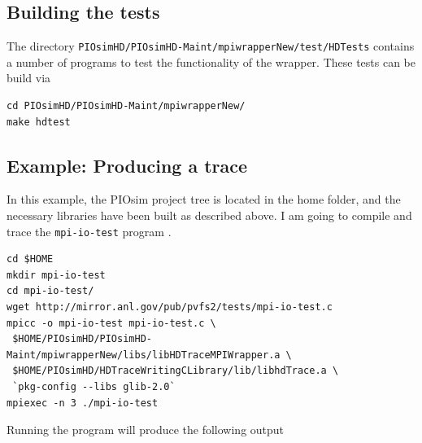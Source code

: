 \documentclass[a4paper,12pt,pdftex]{scrartcl}
\begin{document}
\subsection{Building the tests}
The directory
\lstinline|PIOsimHD/PIOsimHD-Maint/mpiwrapperNew/test/HDTests|
contains a number of programs to test the functionality of the
wrapper. These tests can be build via
\begin{lstlisting}
cd PIOsimHD/PIOsimHD-Maint/mpiwrapperNew/
make hdtest
\end{lstlisting}

\subsection{Example: Producing a trace}
In this example, the PIOsim project tree is located in the home
folder, and the necessary libraries have been built as described
above. I am going to compile and trace the \verb/mpi-io-test/ program
\cite{mpi-io-test}.
\begin{lstlisting}
cd $HOME
mkdir mpi-io-test
cd mpi-io-test/
wget http://mirror.anl.gov/pub/pvfs2/tests/mpi-io-test.c
mpicc -o mpi-io-test mpi-io-test.c \
 $HOME/PIOsimHD/PIOsimHD-Maint/mpiwrapperNew/libs/libHDTraceMPIWrapper.a \
 $HOME/PIOsimHD/HDTraceWritingCLibrary/lib/libhdTrace.a \
 `pkg-config --libs glib-2.0`
mpiexec -n 3 ./mpi-io-test
\end{lstlisting}  %
Running the program will produce the following output
\end{document}
